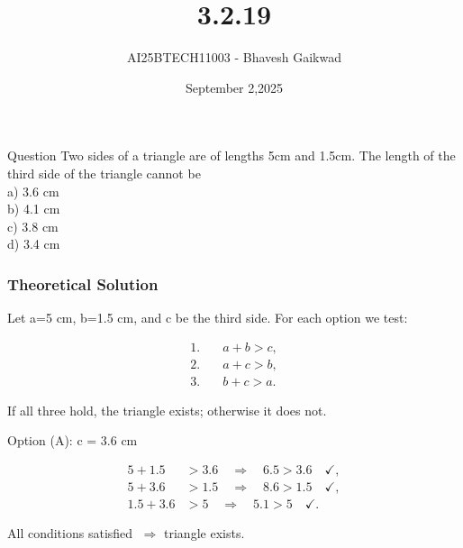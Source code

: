 \documentclass{beamer}
\title
{3.2.19}
\date{September 2,2025}
\author 
{AI25BTECH11003 - Bhavesh Gaikwad}
\begin{document}
\frame{\titlepage}
\begin{frame}{Question}
Two sides of a triangle are of lengths 5cm and 1.5cm. The length of the third side of the triangle cannot be\\
a) 3.6 cm\\
b) 4.1 cm\\
c) 3.8 cm\\
d) 3.4 cm\\
\end{frame}


\begin{frame}[fragile]
    \frametitle{Theoretical Solution}
    Let a=5 cm, b=1.5 cm, and c be the third side. For each option we test:

\begin{align}
1.\quad &a + b > c,\\
2.\quad &a + c > b,\\
3.\quad &b + c > a.
\end{align}

If all three hold, the triangle exists; otherwise it does not.

\bigskip

Option (A): c = 3.6 cm

\begin{align}
5 + 1.5 &> 3.6 \quad\Rightarrow\quad 6.5 > 3.6\quad\checkmark,\\
5 + 3.6 &> 1.5 \quad\Rightarrow\quad 8.6 > 1.5\quad\checkmark,\\
1.5 + 3.6 &> 5 \quad\Rightarrow\quad 5.1 > 5\quad\checkmark.
\end{align}

All conditions satisfied $\;\Rightarrow$ triangle exists.



\end{frame}
\end{document}
